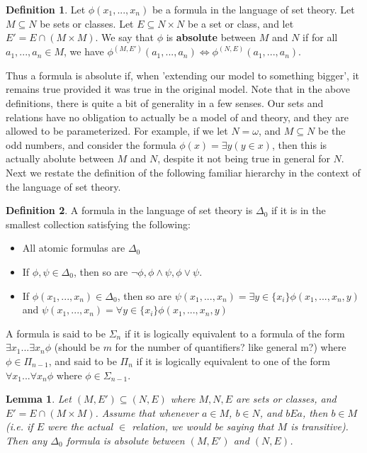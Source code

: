 \documentclass{article}
\theoremstyle{definition}
\newtheorem{definition}{Definition}[section]
\theoremstyle{plain}
\theoremstyle{theorem}
\newtheorem{lemma}{Lemma}[section]
\begin{document}
\begin{definition}
	Let $\phi(x_1,...,x_n)$ be a formula in the language of set theory. Let $M \subseteq N$ be sets or classes. Let $E \subseteq N \times N$ be a set or class, and let $E' = E \cap (M \times M)$. We say that $\phi$ is \textbf{absolute} between $M$ and $N$ if for all $a_1,...,a_n \in M$, we have $\phi^{(M,E')}(a_1,...,a_n) \iff \phi^{(N,E)}(a_1,...,a_n)$.  
\end{definition}
Thus a formula is absolute if, when 'extending our model to something bigger', it remains true provided it was true in the original model. Note that in the above definitions, there is quite a bit of generality in a few senses. Our sets and relations have no obligation to actually be a model of and theory, and they are allowed to be parameterized. For example, if we let $N = \omega$, and $M \subseteq N$ be the odd numbers, and consider the formula $\phi(x) = \exists y (y \in x)$, then this is actually abolute between $M$ and $N$, despite it not being true in general for $N$. Next we restate the definition of the following familiar hierarchy in the context of the language of set theory.
\begin{definition}
	A formula in the language of set theory is $\Delta_0$ if it is in the smallest collection satisfying the following:
	\begin{itemize}
		\item[(1)]
			All atomic formulas are $\Delta_0$
		\item[(2)]
			If $\phi,\psi \in \Delta_0$, then so are $\neg \phi, \phi \wedge \psi,\phi \vee \psi$. 
		\item[(3)] If $\phi(x_1,...,x_n) \in \Delta_0$, then so are $\psi(x_1,...,x_n) = \exists y \in \{x_i\} \phi(x_1,...,x_n,y)$ and $\psi(x_1,...,x_n) = \forall y \in \{x_i\} \phi(x_1,...,x_n,y)$
	\end{itemize}
	A formula is said to be $\Sigma_n$ if it is logically equivalent to a formula of the form $\exists x_1...\exists x_n \phi$ (should be $m$ for the number of quantifiers? like general m?) where $\phi \in \Pi_{n-1}$, and said to be $\Pi_n$ if it is logically equivalent to one of the form $\forall x_1...\forall x_n \phi$ where $\phi \in \Sigma_{n-1}$. 
\end{definition}
\begin{lemma}
	Let $(M,E') \subseteq (N,E)$ where $M,N,E$ are sets or classes, and $E' = E \cap (M \times M)$. Assume that whenever $a \in M$, $b \in N$, and $bEa$, then $b \in M$ (i.e. if $E$ were the actual $\in$ relation, we would be saying that $M$ is transitive). Then any $\Delta_0$ formula is absolute between $(M,E')$ and $(N,E)$. 
\end{lemma}
\end{document}
